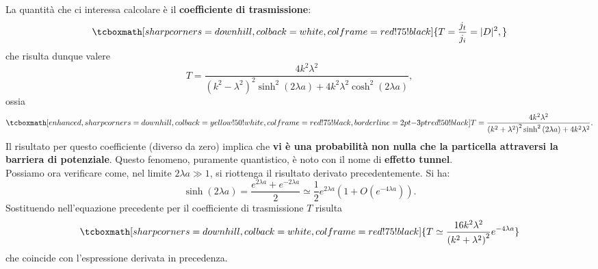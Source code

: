 \documentclass[a4paper,12pt,oneside]{book}
\begin{document}
La quantità che ci interessa calcolare è il \textbf{coefficiente di trasmissione}:
	\begin{equation}
		\tcboxmath[sharp corners=downhill, colback=white, colframe=red!75!black]{
			T=\frac{j_t}{j_i} =|D|^2,
			}
	\end{equation}
che risulta dunque valere
	\begin{equation}
		T=\frac{4k^2 \lambda ^2}{\left(k^2-\lambda^2\right) ^2\sinh ^2\left(2\lambda a\right)+4k^2\lambda ^2\cosh ^2\left(2\lambda a\right)},
	\end{equation}
ossia
	\begin{equation}
		\tcboxmath[enhanced, sharp corners=downhill, colback=yellow!50!white, colframe=red!75!black, borderline={2pt}{-3pt}{red!50!black}]{
			T=\frac{4k^2 \lambda ^2}{\left(k^2+\lambda^2\right) ^2\sinh ^2\left(2\lambda a\right)+4k^2\lambda ^2}.
			}
	\end{equation}
Il risultato per questo coefficiente (diverso da zero) implica che \textbf{vi è una probabilità non nulla che la particella attraversi la barriera di potenziale}. Questo fenomeno, puramente quantistico, è noto con il nome di \textbf{effetto tunnel}.\\

Possiamo ora verificare come, nel limite $2\lambda a \gg 1$, si riottenga il risultato derivato precedentemente. Si ha:
	\begin{equation}
		\sinh \left( 2 \lambda a \right) = \frac{e^{2\lambda a }+ e ^{-2\lambda a }}{2} \simeq \frac{1}{2} e^{2\lambda a} \left( 1+ O(e^{-4\lambda a}) \right).
\end{equation}
Sostituendo nell'equazione precedente per il coefficiente di trasmissione $T$ risulta
	\begin{equation}
		\tcboxmath[sharp corners=downhill, colback=white, colframe=red!75!black]{
		T \simeq \frac{16k^2 \lambda ^2}{\left( k^2+\lambda ^2\right) ^2}e^{-4\lambda a }}
	\end{equation}
che coincide con l'espressione derivata in precedenza.
\end{document}
